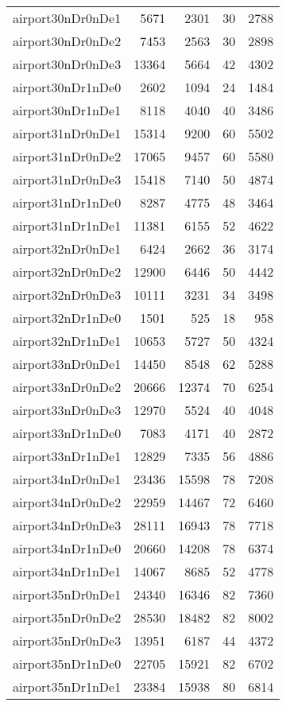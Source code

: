 \begin{longtable}{lrrrr}
airport30nDr0nDe1 & 5671 & 2301 & 30 & 2788 \\
airport30nDr0nDe2 & 7453 & 2563 & 30 & 2898 \\
airport30nDr0nDe3 & 13364 & 5664 & 42 & 4302 \\
airport30nDr1nDe0 & 2602 & 1094 & 24 & 1484 \\
airport30nDr1nDe1 & 8118 & 4040 & 40 & 3486 \\
airport31nDr0nDe1 & 15314 & 9200 & 60 & 5502 \\
airport31nDr0nDe2 & 17065 & 9457 & 60 & 5580 \\
airport31nDr0nDe3 & 15418 & 7140 & 50 & 4874 \\
airport31nDr1nDe0 & 8287 & 4775 & 48 & 3464 \\
airport31nDr1nDe1 & 11381 & 6155 & 52 & 4622 \\
airport32nDr0nDe1 & 6424 & 2662 & 36 & 3174 \\
airport32nDr0nDe2 & 12900 & 6446 & 50 & 4442 \\
airport32nDr0nDe3 & 10111 & 3231 & 34 & 3498 \\
airport32nDr1nDe0 & 1501 & 525 & 18 & 958 \\
airport32nDr1nDe1 & 10653 & 5727 & 50 & 4324 \\
airport33nDr0nDe1 & 14450 & 8548 & 62 & 5288 \\
airport33nDr0nDe2 & 20666 & 12374 & 70 & 6254 \\
airport33nDr0nDe3 & 12970 & 5524 & 40 & 4048 \\
airport33nDr1nDe0 & 7083 & 4171 & 40 & 2872 \\
airport33nDr1nDe1 & 12829 & 7335 & 56 & 4886 \\
airport34nDr0nDe1 & 23436 & 15598 & 78 & 7208 \\
airport34nDr0nDe2 & 22959 & 14467 & 72 & 6460 \\
airport34nDr0nDe3 & 28111 & 16943 & 78 & 7718 \\
airport34nDr1nDe0 & 20660 & 14208 & 78 & 6374 \\
airport34nDr1nDe1 & 14067 & 8685 & 52 & 4778 \\
airport35nDr0nDe1 & 24340 & 16346 & 82 & 7360 \\
airport35nDr0nDe2 & 28530 & 18482 & 82 & 8002 \\
airport35nDr0nDe3 & 13951 & 6187 & 44 & 4372 \\
airport35nDr1nDe0 & 22705 & 15921 & 82 & 6702 \\
airport35nDr1nDe1 & 23384 & 15938 & 80 & 6814 \\

\end{longtable}
